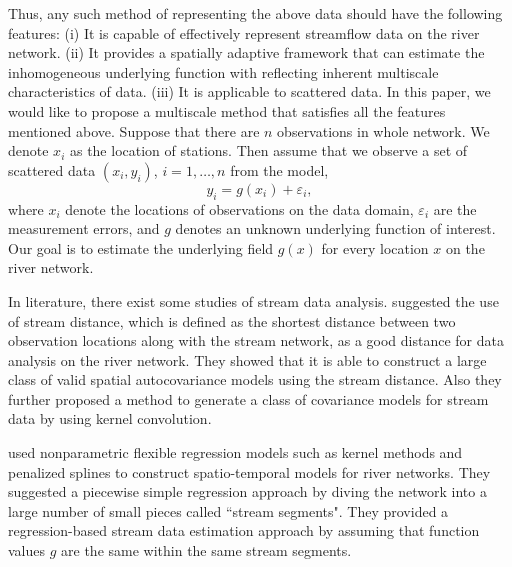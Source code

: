 \documentclass[11pt,titlepage]{article}
\begin{document}
Thus, any such method of representing the above data should have the following features: (i) It is capable of effectively represent streamflow data on the river network. (ii) It provides a spatially adaptive framework that can estimate the inhomogeneous underlying function with reflecting inherent multiscale characteristics of data. (iii) It is applicable to scattered data. In this paper, we would like to propose a multiscale method that satisfies all the features mentioned above. Suppose that there are $n$ observations in whole network. We denote $x_i$ as the location of stations. Then assume that we observe a set of scattered data $(x_i, y_i)$, $i=1,\ldots,n$ from the model,
\begin{equation}\label{eq:scattered}
y_i = g(x_i)+\varepsilon_i, 
\end{equation}
where $x_i$ denote the locations of observations on the data domain, $\varepsilon_i$ are the measurement errors, and $g$  denotes an unknown underlying function of interest. Our goal is to estimate the underlying field $g(x)$ for every location $x$ on the river network. 

In literature, there exist some studies of stream data analysis. \cite{VerHoef(2006)} suggested the use of stream distance, which is defined as the shortest distance between two observation locations along with the stream network, as a good distance for data analysis on the river network. They showed that it is able to construct a large class of valid spatial autocovariance models using the stream distance. Also they further proposed a method to generate a class of covariance models for stream data by using kernel convolution.

\cite{ODonnell2014} used nonparametric flexible regression models such as kernel methods and penalized splines to construct spatio-temporal models for river networks. They suggested a piecewise simple regression approach by diving the network into a large number of small pieces called ``stream segments".  
They provided a regression-based stream data estimation approach by assuming that function values $g$ are the same within the same stream segments.


\end{document}
